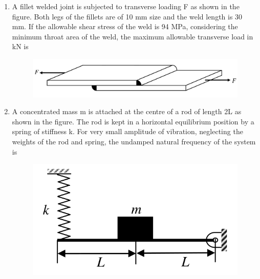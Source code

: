 \documentclass[journal,12pt,onecolumn]{IEEEtran}
\begin{document}
\begin{enumerate}[resume]
    \item A fillet welded joint is subjected to transverse loading F as shown in the figure. Both legs of the fillets are of 10 mm size and the weld length is 30 mm. If the allowable shear stress of the weld is 94 MPa, considering the minimum throat area of the weld, the maximum allowable transverse load in kN is
          \begin{figure}[H]
              \centering
              \includegraphics[scale=0.2]{q32}
              \caption{}
              \label{q32}
          \end{figure}
          \begin{enumerate}
          \end{enumerate}

    \item A concentrated mass m is attached at the centre of a rod of length 2L as shown in the figure. The rod is kept in a horizontal equilibrium position by a spring of stiffness k. For very small amplitude of vibration, neglecting the weights of the rod and spring, the undamped natural frequency of the system is
          \begin{figure}[H]
              \centering
              \includegraphics[scale=0.2]{q33}
              \caption{}
              \label{q33}
          \end{figure}


\end{enumerate}
\end{document}
